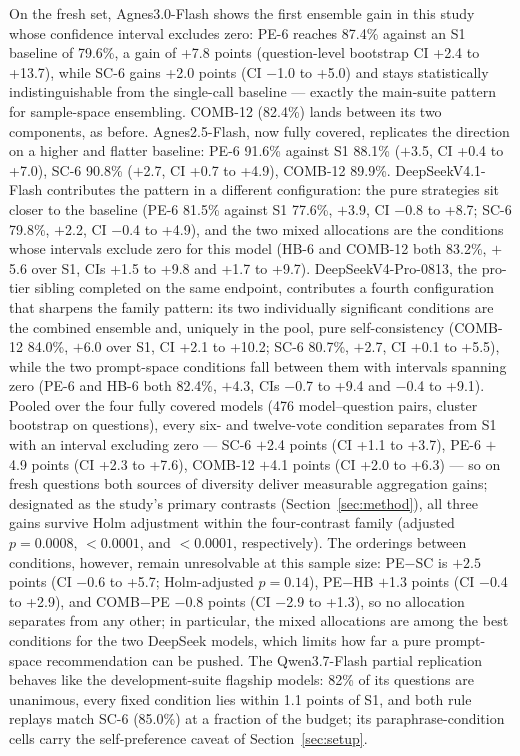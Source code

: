 On the fresh set, Agnes3.0-Flash shows the first ensemble gain in this study whose confidence interval excludes zero: PE-6 reaches 87.4\% against an S1 baseline of 79.6\%, a gain of +7.8 points (question-level bootstrap CI +2.4 to +13.7), while SC-6 gains +2.0 points (CI $-$1.0 to +5.0) and stays statistically indistinguishable from the single-call baseline --- exactly the main-suite pattern for sample-space ensembling. COMB-12 (82.4\%) lands between its two components, as before. Agnes2.5-Flash, now fully covered, replicates the direction on a higher and flatter baseline: PE-6 91.6\% against S1 88.1\% ($+$3.5, CI +0.4 to +7.0), SC-6 90.8\% ($+$2.7, CI +0.7 to +4.9), COMB-12 89.9\%. DeepSeekV4.1-Flash contributes the pattern in a different configuration: the pure strategies sit closer to the baseline (PE-6 81.5\% against S1 77.6\%, $+$3.9, CI $-$0.8 to +8.7; SC-6 79.8\%, $+$2.2, CI $-$0.4 to +4.9), and the two mixed allocations are the conditions whose intervals exclude zero for this model (HB-6 and COMB-12 both 83.2\%, $+$5.6 over S1, CIs +1.5 to +9.8 and +1.7 to +9.7). DeepSeekV4-Pro-0813, the pro-tier sibling completed on the same endpoint, contributes a fourth configuration that sharpens the family pattern: its two individually significant conditions are the combined ensemble and, uniquely in the pool, pure self-consistency (COMB-12 84.0\%, $+$6.0 over S1, CI +2.1 to +10.2; SC-6 80.7\%, $+$2.7, CI +0.1 to +5.5), while the two prompt-space conditions fall between them with intervals spanning zero (PE-6 and HB-6 both 82.4\%, $+$4.3, CIs $-$0.7 to +9.4 and $-$0.4 to +9.1). Pooled over the four fully covered models (476 model--question pairs, cluster bootstrap on questions), every six- and twelve-vote condition separates from S1 with an interval excluding zero --- SC-6 $+$2.4 points (CI +1.1 to +3.7), PE-6 $+$4.9 points (CI +2.3 to +7.6), COMB-12 $+$4.1 points (CI +2.0 to +6.3) --- so on fresh questions both sources of diversity deliver measurable aggregation gains; designated as the study's primary contrasts (Section~\ref{sec:method}), all three gains survive Holm adjustment within the four-contrast family (adjusted $p = 0.0008$, $<0.0001$, and $<0.0001$, respectively). The orderings between conditions, however, remain unresolvable at this sample size: PE$-$SC is $+2.5$ points (CI $-$0.6 to +5.7; Holm-adjusted $p = 0.14$), PE$-$HB $+$1.3 points (CI $-$0.4 to +2.9), and COMB$-$PE $-$0.8 points (CI $-$2.9 to +1.3), so no allocation separates from any other; in particular, the mixed allocations are among the best conditions for the two DeepSeek models, which limits how far a pure prompt-space recommendation can be pushed. The Qwen3.7-Flash partial replication behaves like the development-suite flagship models: 82\% of its questions are unanimous, every fixed condition lies within 1.1 points of S1, and both rule replays match SC-6 (85.0\%) at a fraction of the budget; its paraphrase-condition cells carry the self-preference caveat of Section~\ref{sec:setup}.

